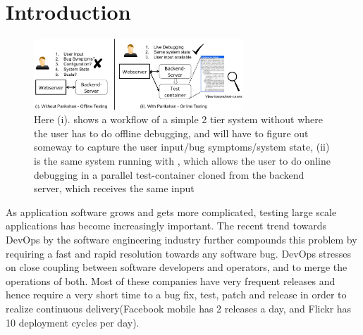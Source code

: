 \section{Introduction}
\label{sec:intro}


\begin{figure}[ht]
  \begin{center}
    \includegraphics[width=0.7\textwidth]{figs/motivation.eps}
    \caption{Here (i). shows a workflow of a simple 2 tier system without \parikshan where the user has to do offline debugging, and will have to figure out someway to capture the user input/bug symptoms/system state, (ii) is the same system running with \parikshan, which allows the user to do online debugging in a parallel test-container cloned from the backend server, which receives the same input}
    \label{fig:motivation}
  \end{center}
\end{figure}


As application software grows and gets more complicated, testing large scale applications has become increasingly important. 
The recent trend towards DevOps\cite{devops} by the software engineering industry further compounds this problem by requiring a fast and rapid resolution towards any software bug.
DevOps stresses on close coupling between software developers and operators, and to merge the operations of both. 
Most of these companies have very frequent releases and hence require a very short time to a bug fix, test, patch and release in order to realize continuous delivery(Facebook mobile has 2 releases a day, and Flickr has 10 deployment cycles per day).

